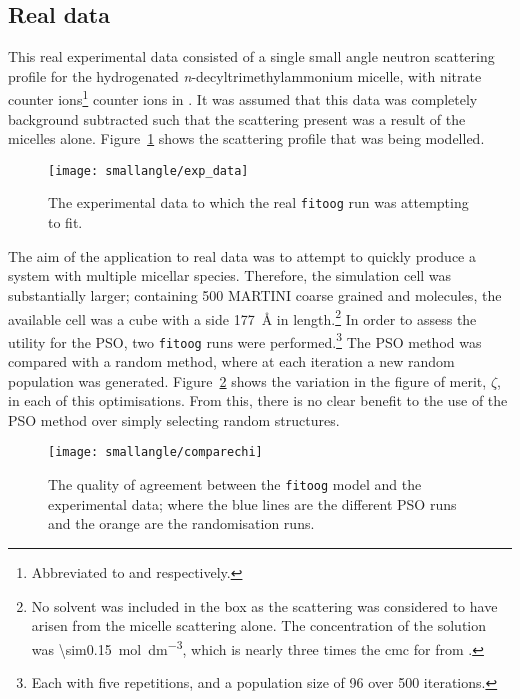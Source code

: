 \subsection{Real data}
\label{sec:real_data}
This real experimental data consisted of a single small angle neutron scattering profile for the hydrogenated \emph{n}-decyltrimethylammonium micelle, with nitrate counter ions\footnote{Abbreviated to  and  respectively.} counter ions in .
It was assumed that this data was completely background subtracted such that the scattering present was a result of the micelles alone.
Figure~\ref{fig:expdata} shows the scattering profile that was being modelled.
%
\begin{figure}
    \centering
    \texttt{[image: smallangle/exp\_data]}
    \caption{The experimental data to which the real \texttt{fitoog} run was attempting to fit.}
    \label{fig:expdata}
\end{figure}
%

The aim of the application to real data was to attempt to quickly produce a system with multiple micellar species.
Therefore, the simulation cell was substantially larger; containing 500 MARTINI coarse grained  and  molecules, the available cell was a cube with a side \SI{177}{\angstrom} in length.\footnote{No solvent was included in the box as the scattering was considered to have arisen from the micelle scattering alone. The concentration of the solution was \SI{\sim0.15}{\mol\deci\meter^{-3}}, which is nearly three times the cmc for  from \cite{rodriguez_surface_2007}.}
In order to assess the utility for the PSO, two \texttt{fitoog} runs were performed.\footnote{Each with five repetitions, and a population size of 96 over 500 iterations.}
The PSO method was compared with a random method, where at each iteration a new random population was generated.
Figure~\ref{fig:chi} shows the variation in the figure of merit, $\zeta$, in each of this optimisations.
From this, there is no clear benefit to the use of the PSO method over simply selecting random structures.
%
\begin{figure}
    \centering
    \texttt{[image: smallangle/comparechi]}
    \caption{The quality of agreement between the \texttt{fitoog} model and the experimental data; where the blue lines are the different PSO runs and the orange are the randomisation runs.}
    \label{fig:chi}
\end{figure}
%

